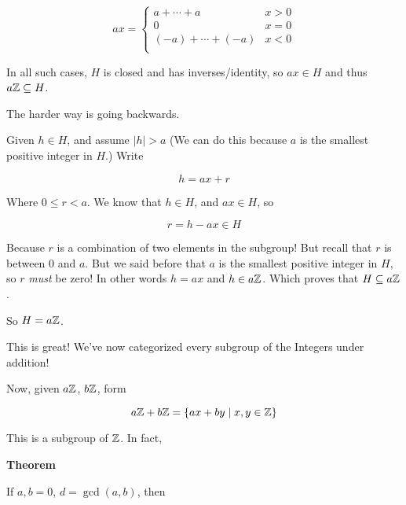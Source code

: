 \documentclass[12pt]{article}
\begin{document}
\[
  ax = \begin{cases}
    a + \cdots + a & x > 0 \\
    0              & x = 0 \\
    (-a) + \cdots + (-a) & x < 0 \\
  \end{cases}
\]

In all such cases, $H$ is closed and has inverses/identity, so $ax \in H$ and
thus $a{\mathbb Z} \subseteq H$.

The harder way is going backwards.

Given $h \in H$, and assume $|h| > a$ (We can do this because $a$ is the
smallest positive integer in $H$.) Write

\[
  h = ax + r
\]

Where $0 \le r < a$. We know that $h \in H$, and $ax \in H$, so

\[
  r = h - ax \in H
\]

Because $r$ is a combination of two elements in the subgroup! But recall that
$r$ is between $0$ and $a$. But we said before that $a$ is the smallest positive
integer in $H$, so $r$ {\it must} be zero! In other words $h = ax$ and $h \in
a{\mathbb Z}$. Which proves that $H \subseteq a{\mathbb Z}$.

So $H = a{\mathbb Z}$.


This is great! We've now categorized every subgroup of the Integers under
addition!

Now, given $a{\mathbb Z}$, $b{\mathbb Z}$, form

\[
  a{\mathbb Z} + b{\mathbb Z} = \{ax + by \mid x, y \in {\mathbb Z} \}
\]

This is a subgroup of ${\mathbb Z}$. In fact,

{\bf Theorem}



If $a, b = 0$, $d = \gcd(a, b)$, then
\end{document}
